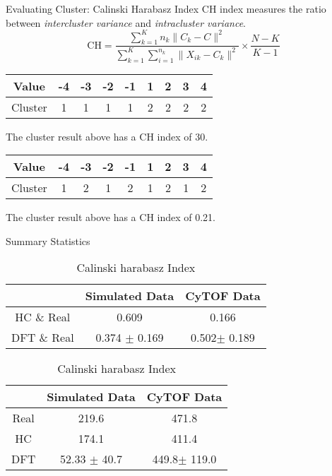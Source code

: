 \documentclass{beamer}
\begin{document}
	\begin{frame}{Evaluating Cluster: Calinski Harabasz Index}
	CH index measures the ratio between \emph{intercluster variance} and \emph{intracluster variance}.
			$$ \text{CH} = \frac{ \sum_{k=1}^{K}n_{k} \lVert C_{k} - C \rVert^2 }{\sum_{k=1}^{K}\sum_{i=1}^{n_k} \lVert X_{ik} - C_{k} \rVert^2  } \times \frac{N-K}{K-1} $$
			\pause
		\begin{table}[htbp]
			\centering
			\begin{tabular}{c|c|c|c|c|c|c|c|c}
				Value & -4 & -3 & -2 & -1 & 1 & 2 & 3 & 4 \\
				\hline
				Cluster & 1 & 1 & 1 & 1 & 2 & 2 & 2 & 2 
			\end{tabular}
		\end{table}
		 The cluster result above has a CH index of 30.
		
		\pause
		\begin{table}[htbp]
			\centering
			\begin{tabular}{c|c|c|c|c|c|c|c|c}
				Value & -4 & -3 & -2 & -1 & 1 & 2 & 3 & 4 \\
				\hline
				Cluster & 1 & 2 & 1 & 2 & 1 & 2 & 1 & 2 
			\end{tabular}
		\end{table}
		
		The cluster result above has a CH index of 0.21.
	\end{frame}
	
	\begin{frame}{Summary Statistics}
				 \begin{table}[htbp]
				 		\centering
    		\begin{tabular}{ccc}
       				\toprule
       					& Simulated Data & CyTOF Data\\
      				 \midrule
       					HC \& Real & 0.609 & 0.166\\
       				DFT \& Real & 0.374 $\pm$ 0.169 & 0.502$\pm$ 0.189\\
       				\bottomrule
    				\end{tabular}
    				\caption*{Adjusted Rand Index}

    		\begin{tabular}{ccc}
       \toprule
       & Simulated Data & CyTOF Data\\
       \midrule
       Real & 219.6 & 471.8\\
       HC & 174.1 & 411.4\\
       DFT & 52.33 $\pm$ 40.7 & 449.8$\pm$ 119.0\\
       \bottomrule
    \end{tabular}
    				\caption*{Calinski harabasz Index}
				 \end{table}
	
	\end{frame}
	
\end{document}
